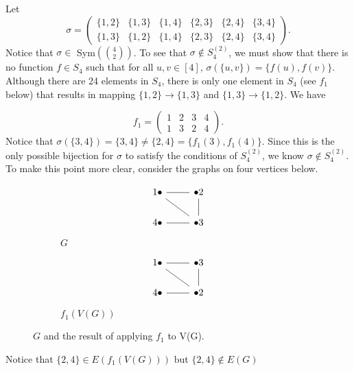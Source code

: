 \begin{example}\label{ex:ex223}
Let \[\sigma=\begin{pmatrix}\{1,2\}&\{1,3\}&\{1,4\}&\{2,3\}&\{2,4\}&\{3,4\}\\
\{1,3\}&\{1,2\}&\{1,4\}&\{2,3\}&\{2,4\}&\{3,4\}
\end{pmatrix}.\] 
Notice that $\sigma\in$ Sym$\left({4\choose 2}\right)$. To see that $\sigma\notin S_4^{(2)}$, we must show that there is no function $f\in S_4$ such that for all $u,v\in [4]$, $\sigma(\{u,v\})=\{f(u),f(v)\}$. Although there are 24 elements in $S_4$, there is only one element in $S_4$ (see $f_1$ below) that results in mapping $\{1,2\}\rightarrow \{1,3\}$ and $\{1,3\}\rightarrow\{1,2\}$. We have

\[f_1=\begin{pmatrix}1&2&3&4\\
1&3&2&4
\end{pmatrix}.\]
Notice that $\sigma (\{3,4\})=\{3,4\}\ne \{2,4\}=\{f_1(3),f_1(4)\}$. Since this is the only possible bijection for $\sigma$ to satisfy the conditions of $S_4^{(2)}$, we know $\sigma\notin S_4^{(2)}$. To make this point more clear, consider the graphs on four vertices below. 
\begin{figure}[H]
\begin{subfigure}{.5\textwidth}
\[\begin{tikzcd}
	1\bullet & {\bullet 2} \\
	4\bullet & {\bullet 3}
	\arrow[no head, from=1-1, to=1-2]
	\arrow[no head, from=1-2, to=2-2]
	\arrow[no head, from=2-2, to=1-1]
	\arrow[no head, from=2-2, to=2-1]
\end{tikzcd}\]
\caption{$G$}
\end{subfigure}
\begin{subfigure}{.5\textwidth}
\[\begin{tikzcd}
	1\bullet & {\bullet 3} \\
	4\bullet & {\bullet 2}
	\arrow[no head, from=1-1, to=1-2]
	\arrow[no head, from=1-2, to=2-2]
	\arrow[no head, from=2-2, to=1-1]
	\arrow[no head, from=2-2, to=2-1]
\end{tikzcd}\]
\caption{$f_1(V(G))$}
\end{subfigure}
\caption{$G$ and the result of applying $f_1$ to V(G).}
\end{figure}
Notice that $\{2,4\}\in E(f_1(V(G)))$ but $\{2,4\}\notin E(G)$ 
\end{example}




